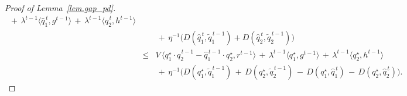 \documentclass[12pt, final]{l4dc2023}
\begin{document}
\begin{proof}[Proof of Lemma~\ref{lem.gap_pd}]
\begin{equation}
\begin{array}{rcl}
	\,+\,
	\lambda^{t-1} \langle{\hat q_1^{\,t}},{g^{t-1}}\rangle 
	\,+\,\lambda^{t-1} \langle{ \hat q_2^{\,t}},{h^{t-1}}\rangle 
	\\[0.2cm]
	&& \!\!\!\! \!\!\!\! \!\! \,+\, \eta^{-1} \big(D(\hat q_1^{\,t}, \tilde q_1^{\,t-1}) + D(\hat q_2^{\,t}, \tilde q_2^{\,t-1})\big)
	\\[0.2cm]
	&\leq&  V\, \big\langle{ q_1^\star\cdot \hat q_2^{\,t-1}-\hat q_1^{\,t-1}\cdot  q_2^\star },{r^{t-1}}\big\rangle 
	\,+\,
	\lambda^{t-1} \langle{ q_1^\star},{g^{t-1}}\rangle 
	\,+\,\lambda^{t-1} \langle{ q_2^\star},{h^{t-1}}\rangle 
	\\[0.2cm]
	&& \,+\, \eta^{-1} \big(D( q_1^\star,\tilde q_1^{\,t-1}) \,+\, D( q_2^\star, \tilde q_2^{\,t-1}) \,-\, D( q_1^\star,\hat q_1^{\,t}) \,-\, D( q_2^\star, \hat q_2^{\,t}) \big).
	\end{array}
	\end{equation}
	

\end{proof}
\end{document}
